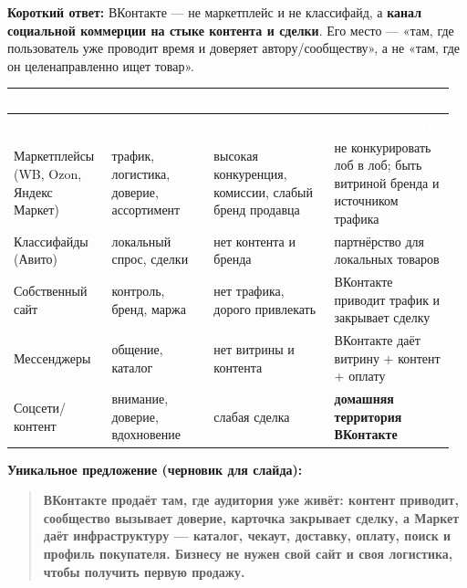 \documentclass[10pt,a4paper]{article}
\begin{document}
\textbf{Короткий ответ:} ВКонтакте — не маркетплейс и не классифайд, а \textbf{канал социальной коммерции на стыке контента и сделки}. Его место — «там, где пользователь уже проводит время и доверяет автору/сообществу», а не «там, где он целенаправленно ищет товар».\par

\begingroup
\small
\setlength{\tabcolsep}{3pt}
\renewcommand{\arraystretch}{1.12}
\begin{longtable}{@{}>{\raggedright\arraybackslash}p{0.2165\linewidth}>{\raggedright\arraybackslash}p{0.2222\linewidth}>{\raggedright\arraybackslash}p{0.2621\linewidth}>{\raggedright\arraybackslash}p{0.2621\linewidth}@{}}
\rowcolor{blue}
\textcolor{white}{\textbf{Канал}} & \textcolor{white}{\textbf{Сила}} & \textcolor{white}{\textbf{Слабость}} & \textcolor{white}{\textbf{Место ВКонтакте}} \\
\endfirsthead
\rowcolor{blue}
\textcolor{white}{\textbf{Канал}} & \textcolor{white}{\textbf{Сила}} & \textcolor{white}{\textbf{Слабость}} & \textcolor{white}{\textbf{Место ВКонтакте}} \\
\endhead
\hline
Маркетплейсы (WB, Ozon, Яндекс Маркет) & трафик, логистика, доверие, ассортимент & высокая конкуренция, комиссии, слабый бренд продавца & не конкурировать лоб в лоб; быть витриной бренда и источником трафика \\
Классифайды (Авито) & локальный спрос, сделки & нет контента и бренда & партнёрство для локальных товаров \\
Собственный сайт & контроль, бренд, маржа & нет трафика, дорого привлекать & ВКонтакте приводит трафик и закрывает сделку \\
Мессенджеры & общение, каталог & нет витрины и контента & ВКонтакте даёт витрину + контент + оплату \\
Соцсети/контент & внимание, доверие, вдохновение & слабая сделка & \textbf{домашняя территория ВКонтакте} \\
\hline
\end{longtable}
\endgroup
\vspace{4pt}

\noindent\textbf{Уникальное предложение (черновик для слайда):}\par\vspace{4pt}

\begin{quote}
\noindent\colorbox{soft}{\parbox{\dimexpr\linewidth-2\fboxsep}{
\raggedright \textbf{ВКонтакте продаёт там, где аудитория уже живёт: контент приводит, сообщество вызывает доверие, карточка закрывает сделку, а Маркет даёт инфраструктуру — каталог, чекаут, доставку, оплату, поиск и профиль покупателя. Бизнесу не нужен свой сайт и своя логистика, чтобы получить первую продажу.}
}}
\end{quote}
\vspace{2pt}
\end{document}
